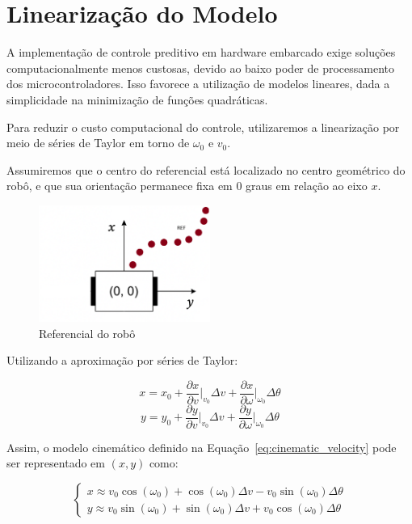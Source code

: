 \section{Linearização do Modelo}

A implementação de controle preditivo em hardware embarcado 
exige soluções computacionalmente menos custosas, 
devido ao baixo poder de processamento dos microcontroladores. 
Isso favorece a utilização de modelos lineares, dada a simplicidade 
na minimização de funções quadráticas.

\vspace{1em}
Para reduzir o custo computacional do controle, 
utilizaremos a linearização por meio de séries de Taylor 
em torno de $\omega_0$ e $v_0$.

\vspace{1em}
Assumiremos que o centro do referencial está localizado no 
centro geométrico do robô, e que sua orientação permanece 
fixa em 0 graus em relação ao eixo $x$.

\begin{figure}[h]
    \centering
    \includegraphics[width=0.5\textwidth]{figures/robot_reference.png}
    \caption{Referencial do robô}
    \label{fig:robot_reference}
\end{figure}

Utilizando a aproximação por séries de Taylor:

\[
x = x_0 + \frac{\partial x}{\partial v} \bigg|_{v_0} \Delta v + \frac{\partial x}{\partial \omega} \bigg|_{\omega_0} \Delta \theta
\]
\[
y = y_0 + \frac{\partial y}{\partial v} \bigg|_{v_0} \Delta v + \frac{\partial y}{\partial \omega} \bigg|_{\omega_0} \Delta \theta
\]

Assim, o modelo cinemático definido na Equação~\ref{eq:cinematic_velocity} 
pode ser representado em $(x, y)$ como:

\begin{equation}
\begin{cases}
x \approx v_0 \cos(\omega_0) + \cos(\omega_0) \Delta v - v_0 \sin(\omega_0) \Delta \theta \\
y \approx v_0 \sin(\omega_0) + \sin(\omega_0) \Delta v + v_0 \cos(\omega_0) \Delta \theta
\end{cases}
\end{equation}

